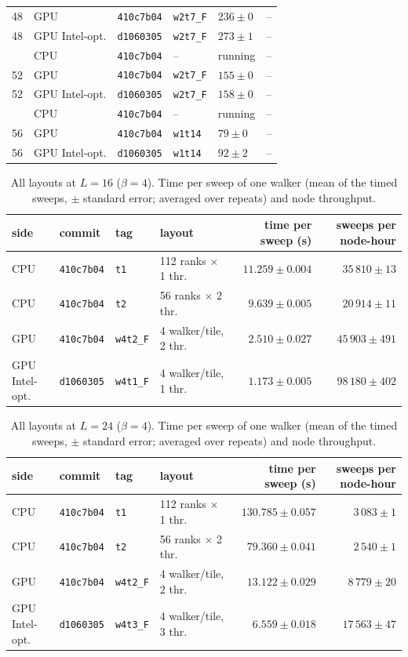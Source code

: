 \begin{table}[h]
\begin{tabular}{@{}rllllr@{}}
48 & GPU & \texttt{410c7b04} & \texttt{w2t7\_F} & $236 \pm 0$ & --\\
48 & GPU Intel-opt. & \texttt{d1060305} & \texttt{w2t7\_F} & $273 \pm 1$ & --\\
\addlinespace
52 & CPU & \texttt{410c7b04} & -- & running & --\\
52 & GPU & \texttt{410c7b04} & \texttt{w2t7\_F} & $155 \pm 0$ & --\\
52 & GPU Intel-opt. & \texttt{d1060305} & \texttt{w2t7\_F} & $158 \pm 0$ & --\\
\addlinespace
56 & CPU & \texttt{410c7b04} & -- & running & --\\
56 & GPU & \texttt{410c7b04} & \texttt{w1t14} & $79 \pm 0$ & --\\
56 & GPU Intel-opt. & \texttt{d1060305} & \texttt{w1t14} & $92 \pm 2$ & --\\
\bottomrule\end{tabular}\end{table}
\begin{table}[h]\centering\small
\caption{All layouts at $L=16$ ($\beta=4$). Time per sweep of one walker (mean of the timed sweeps, $\pm$ standard error; averaged over repeats) and node throughput.}
\begin{tabular}{@{}llllrr@{}}\toprule
side & commit & tag & layout & time per sweep (s) & sweeps per node-hour\\\midrule
CPU & \texttt{410c7b04} & \texttt{t1} & 112 ranks $\times$ 1 thr. & $11.259 \pm 0.004$ & $35\,810 \pm 13$\\
CPU & \texttt{410c7b04} & \texttt{t2} & 56 ranks $\times$ 2 thr. & $9.639 \pm 0.005$ & $20\,914 \pm 11$\\
GPU & \texttt{410c7b04} & \texttt{w4t2\_F} & 4 walker/tile, 2 thr. & $2.510 \pm 0.027$ & $45\,903 \pm 491$\\
GPU Intel-opt. & \texttt{d1060305} & \texttt{w4t1\_F} & 4 walker/tile, 1 thr. & $1.173 \pm 0.005$ & $98\,180 \pm 402$\\
\bottomrule\end{tabular}\end{table}
\begin{table}[h]\centering\small
\caption{All layouts at $L=24$ ($\beta=4$). Time per sweep of one walker (mean of the timed sweeps, $\pm$ standard error; averaged over repeats) and node throughput.}
\begin{tabular}{@{}llllrr@{}}\toprule
side & commit & tag & layout & time per sweep (s) & sweeps per node-hour\\\midrule
CPU & \texttt{410c7b04} & \texttt{t1} & 112 ranks $\times$ 1 thr. & $130.785 \pm 0.057$ & $3\,083 \pm 1$\\
CPU & \texttt{410c7b04} & \texttt{t2} & 56 ranks $\times$ 2 thr. & $79.360 \pm 0.041$ & $2\,540 \pm 1$\\
GPU & \texttt{410c7b04} & \texttt{w4t2\_F} & 4 walker/tile, 2 thr. & $13.122 \pm 0.029$ & $8\,779 \pm 20$\\
GPU Intel-opt. & \texttt{d1060305} & \texttt{w4t3\_F} & 4 walker/tile, 3 thr. & $6.559 \pm 0.018$ & $17\,563 \pm 47$\\
\bottomrule\end{tabular}\end{table}
